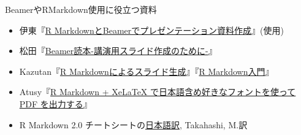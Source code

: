 \documentclass[
  14pt,
  ignorenonframetext,
]{beamer}
\providecommand{\tightlist}{%
  \setlength{\itemsep}{0pt}\setlength{\parskip}{0pt}}
\begin{document}
\begin{frame}{BeamerやRMarkdown使用に役立つ資料}
\protect\hypertarget{beamerux3084rmarkdownux4f7fux7528ux306bux5f79ux7acbux3064ux8cc7ux6599}{}

\begin{itemize}
\tightlist
\item
  伊東『\href{https://www.slideshare.net/hirokito/r-markdownbeamer-88777082}{R
  MarkdownとBeamerでプレゼンテーション資料作成}』(\LuaLaTeX 使用)
\item
  松田『\href{http://ayapin-film.sakura.ne.jp/LaTeX/slides.html\#beamer}{Beamer読本-講演用スライド作成のために-}』
\item
  Kazutan『\href{https://kazutan.github.io/SappoRoR6/rmd_slide.html\#/}{R
  Markdownによるスライド生成}』『\href{https://kazutan.github.io/kazutanR/Rmd_intro.html}{R
  Markdown入門}』
\item
  Atusy『\href{https://blog.atusy.net/2019/05/14/rmd2pdf-any-font/}{R
  Markdown + XeLaTeX で日本語含め好きなフォントを使って PDF
  を出力する}』
\item
  R Markdown 2.0
  チートシートの\href{https://rstudio.com/wp-content/uploads/2016/11/Rmarkdown-cheatsheet-2.0_ja.pdf}{日本語訳},
  Takahashi, M.訳
\end{itemize}

\end{frame}
\end{document}
